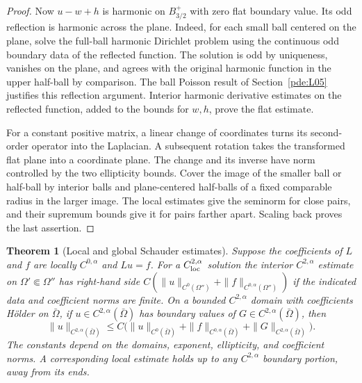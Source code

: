 \documentclass[11pt,oneside,openany]{book}
\theoremstyle{plain}
\newtheorem{theorem}{Theorem}[chapter]
\theoremstyle{definition}
\theoremstyle{remark}
\begin{document}
\begin{proof}
Now \(u-w+h\) is harmonic on \(B_{3/2}^+\) with zero flat
boundary value. Its odd reflection is harmonic across the
plane. Indeed, for each small ball centered on the plane,
solve the full-ball harmonic Dirichlet problem using the
continuous odd boundary data of the reflected function.
The solution is odd by uniqueness, vanishes on the plane,
and agrees with the original harmonic function in the
upper half-ball by comparison. The ball Poisson result of
Section~\ref{pde:L05} justifies this reflection argument.
Interior harmonic derivative estimates on the reflected
function, added to the bounds for \(w,h\), prove the flat
estimate.

For a constant positive matrix, a linear change of
coordinates turns its second-order operator into the
Laplacian. A subsequent rotation takes the transformed flat
plane into a coordinate plane. The change and its inverse
have norm controlled by the two ellipticity bounds. Cover
the image of the smaller ball or half-ball by interior
balls and plane-centered half-balls of a fixed comparable
radius in the larger image. The local estimates give the
seminorm for close pairs, and their supremum bounds give it
for pairs farther apart. Scaling back proves the last
assertion.
\end{proof}

\begin{theorem}[Local and global Schauder estimates]
\label{pde:elliptic-variable-estimate}
Suppose the coefficients of \(L\) and \(f\) are locally
\(C^{0,\alpha}\) and \(Lu=f\). For a \(C^{2,\alpha}_{\rm loc}\)
solution the interior \(C^{2,\alpha}\) estimate on
\(\Omega'\Subset\Omega''\) has right-hand side
\(C(\|u\|_{C^0(\Omega'')}+\|f\|_{C^{0,\alpha}(\Omega'')})\)
if the indicated data and coefficient norms are finite.
On a bounded \(C^{2,\alpha}\) domain with coefficients Hölder
on \(\bar\Omega\), if \(u\in C^{2,\alpha}(\bar\Omega)\) has
boundary values of \(G\in C^{2,\alpha}(\bar\Omega)\), then
\[
 \|u\|_{C^{2,\alpha}(\bar\Omega)}
 \leq C\bigl(\|u\|_{C^0(\bar\Omega)}
       +\|f\|_{C^{0,\alpha}(\bar\Omega)}
       +\|G\|_{C^{2,\alpha}(\bar\Omega)}\bigr).
\]
The constants depend on the domains, exponent, ellipticity,
and coefficient norms. A corresponding local estimate holds
up to any \(C^{2,\alpha}\) boundary portion, away from its ends.
\end{theorem}
\end{document}
